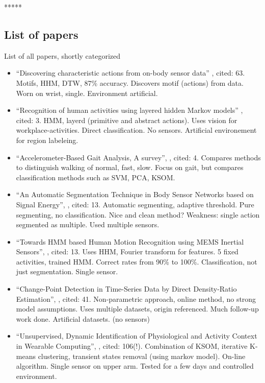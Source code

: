
*****
\subsection{List of papers}
List of all papers, shortly categorized
\begin{itemize}
  \item ``Discovering characteristic actions from on-body sensor data'' \cite{minnen2006discovering}, cited: 63. Motifs, HHM, DTW, 87\% accuracy. Discovers motif (actions) from data. Worn on wrist, single. Environment artificial.
  \item ``Recognition of human activities using layered hidden Markov models'' \cite{perdikis2008recognition}, cited: 3. HMM, layerd (primitive and abstract actions). Uses vision for workplace-activities. Direct classification. No sensors. Artificial environement for region labeleing.
  \item ``Accelerometer-Based Gait Analysis, A survey'', \cite{derawi2010accelerometer}, cited: 4. Compares methods to distinguish walking of normal, fast, slow. Focus on gait, but compares classification methods such as SVM, PCA, KSOM.
  \item ``An Automatic Segmentation Technique in Body Sensor Networks based on Signal Energy'', \cite{guenterberg2009automatic}, cited: 13. Automatic segmenting, adaptive threshold. Pure segmenting, no classification. Nice and clean method? Weakness: single action segmented as multiple. Used multiple sensors.
  \item ``Towards HMM based Human Motion Recognition using MEMS Inertial Sensors'', \cite{shi2009towards}, cited: 13. Uses HHM, Fourier transform for features. 5 fixed activities, trained HMM. Correct rates from 90\% to 100\%. Classification, not just segmentation. Single sensor.
  \item ``Change-Point Detection in Time-Series Data by Direct Density-Ratio Estimation'', \cite{kawahara2009change}, cited: 41. Non-parametric approach, online method, no strong model assumptions. Uses multiple datasets, origin referenced. Much follow-up work done. Artificial datasets. (no sensors)
  \item ``Unsupervised, Dynamic Identification of Physiological and Activity Context in Wearable Computing'', \cite{krause2003unsupervised}, cited: 106(!). Combination of KSOM, iterative K-means clustering, transient states removal (using markov model). On-line algorithm. Single sensor on upper arm. Tested for a few days and controlled environment.

\end{itemize}
